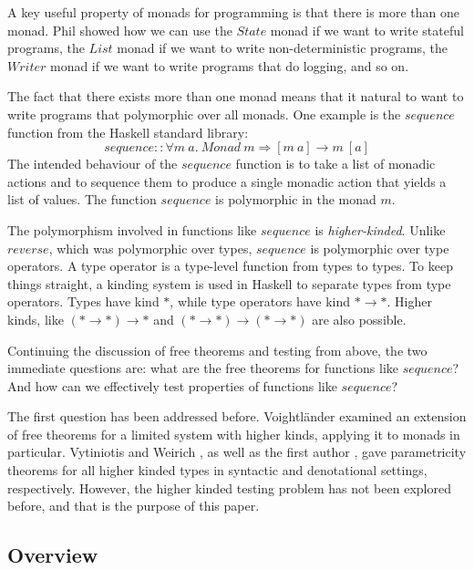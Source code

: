 \documentclass{llncs}
\begin{document}
A key useful property of monads for programming is that there is more
than one monad. Phil showed how we can use the $\mathit{State}$ monad
if we want to write stateful programs, the $\mathit{List}$ monad if we
want to write non-deterministic programs, the $\mathit{Writer}$ monad
if we want to write programs that do logging, and so on.

The fact that there exists more than one monad means that it natural
to want to write programs that polymorphic over all monads. One
example is the $\mathit{sequence}$ function from the Haskell standard
library:
\begin{displaymath}
  \mathit{sequence} :: \forall m~a.~\mathit{Monad}~m \Rightarrow [m~a] \to m~[a]
\end{displaymath}
The intended behaviour of the $\mathit{sequence}$ function is to take
a list of monadic actions and to sequence them to produce a single
monadic action that yields a list of values. The function
$\mathit{sequence}$ is polymorphic in the monad $m$.

The polymorphism involved in functions like $\mathit{sequence}$ is
\emph{higher-kinded}. Unlike $\mathit{reverse}$, which was polymorphic
over types, $\mathit{sequence}$ is polymorphic over type operators. A
type operator is a type-level function from types to types. To keep
things straight, a kinding system is used in Haskell to separate types
from type operators. Types have kind $*$, while type operators have
kind $* \to *$. Higher kinds, like $(* \to *) \to *$ and
$(* \to *) \to (* \to *)$ are also possible.

Continuing the discussion of free theorems and testing from above, the
two immediate questions are: what are the free theorems for functions
like $\mathit{sequence}$? And how can we effectively test properties
of functions like $\mathit{sequence}$?

The first question has been addressed before. Voightl{\"a}nder
\cite{DBLP:journals/jfp/VytiniotisW10} examined an extension of free
theorems for a limited system with higher kinds, applying it to monads
in particular. Vytiniotis and Weirich
\cite{DBLP:journals/jfp/VytiniotisW10}, as well as the first author
\cite{atkey12relational}, gave parametricity theorems for all higher
kinded types in syntactic and denotational settings,
respectively. However, the higher kinded testing problem has not been
explored before, and that is the purpose of this paper.

\subsection{Overview}
\end{document}
